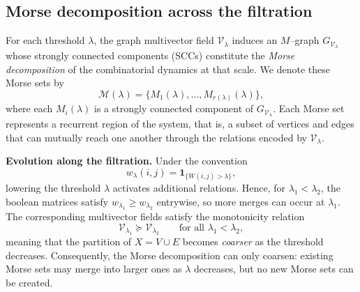 \documentclass{article}
\theoremstyle{definition}
\theoremstyle{plain}
\theoremstyle{remark}
\newcommand{\1}{\mathbbm{1}}  %
\begin{document}
 
 
 
 \subsection{Morse decomposition across the filtration}
\label{sec:morse-filtration}

For each threshold $\lambda$, the graph multivector field
$\mathcal V_\lambda$ induces an $M$--graph
$G_{\mathcal V_\lambda}$ whose strongly connected components (SCCs)
constitute the \emph{Morse decomposition} of the combinatorial dynamics
at that scale.  
We denote these Morse sets by
\[
\mathcal M(\lambda)
  = \{ M_1(\lambda), \dots, M_{r(\lambda)}(\lambda) \},
\]
where each $M_i(\lambda)$ is a strongly connected component of
$G_{\mathcal V_\lambda}$.  
Each Morse set represents a recurrent region of the system, that is, a
subset of vertices and edges that can mutually reach one another through
the relations encoded by $\mathcal V_\lambda$.

\medskip
\noindent\textbf{Evolution along the filtration.}
Under the convention
\[
w_\lambda(i,j)=\mathbf{1}_{\{W(i,j)>\lambda\}},
\]
lowering the threshold $\lambda$ activates additional relations.
Hence, for $\lambda_1 < \lambda_2$, the boolean matrices satisfy
$w_{\lambda_1} \ge w_{\lambda_2}$ entrywise, so more merges can occur at
$\lambda_1$.  
The corresponding multivector fields satisfy the monotonicity relation
\[
\mathcal V_{\lambda_1} \succeq \mathcal V_{\lambda_2}
\qquad\text{for all } \lambda_1<\lambda_2,
\]
meaning that the partition of $X=V\cup E$ becomes \emph{coarser} as the
threshold decreases.  
Consequently, the Morse decomposition can only coarsen: existing Morse
sets may merge into larger ones as $\lambda$ decreases, but no new Morse
sets can be created.
\end{document}
